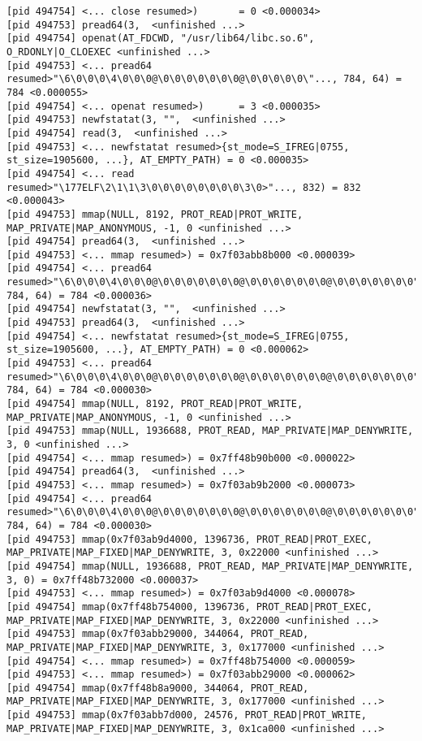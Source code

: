 \documentclass[a4paper, 12pt]{article}
\begin{document}
\begin{lstlisting}
[pid 494754] <... close resumed>)       = 0 <0.000034>
[pid 494753] pread64(3,  <unfinished ...>
[pid 494754] openat(AT_FDCWD, "/usr/lib64/libc.so.6", O_RDONLY|O_CLOEXEC <unfinished ...>
[pid 494753] <... pread64 resumed>"\6\0\0\0\4\0\0\0@\0\0\0\0\0\0\0@\0\0\0\0\0\"..., 784, 64) = 784 <0.000055>
[pid 494754] <... openat resumed>)      = 3 <0.000035>
[pid 494753] newfstatat(3, "",  <unfinished ...>
[pid 494754] read(3,  <unfinished ...>
[pid 494753] <... newfstatat resumed>{st_mode=S_IFREG|0755, st_size=1905600, ...}, AT_EMPTY_PATH) = 0 <0.000035>
[pid 494754] <... read resumed>"\177ELF\2\1\1\3\0\0\0\0\0\0\0\0\3\0>"..., 832) = 832 <0.000043>
[pid 494753] mmap(NULL, 8192, PROT_READ|PROT_WRITE, MAP_PRIVATE|MAP_ANONYMOUS, -1, 0 <unfinished ...>
[pid 494754] pread64(3,  <unfinished ...>
[pid 494753] <... mmap resumed>) = 0x7f03abb8b000 <0.000039>
[pid 494754] <... pread64 resumed>"\6\0\0\0\4\0\0\0@\0\0\0\0\0\0\0@\0\0\0\0\0\0\0@\0\0\0\0\0\0\0"..., 784, 64) = 784 <0.000036>
[pid 494754] newfstatat(3, "",  <unfinished ...>
[pid 494753] pread64(3,  <unfinished ...>
[pid 494754] <... newfstatat resumed>{st_mode=S_IFREG|0755, st_size=1905600, ...}, AT_EMPTY_PATH) = 0 <0.000062>
[pid 494753] <... pread64 resumed>"\6\0\0\0\4\0\0\0@\0\0\0\0\0\0\0@\0\0\0\0\0\0\0@\0\0\0\0\0\0\0"..., 784, 64) = 784 <0.000030>
[pid 494754] mmap(NULL, 8192, PROT_READ|PROT_WRITE, MAP_PRIVATE|MAP_ANONYMOUS, -1, 0 <unfinished ...>
[pid 494753] mmap(NULL, 1936688, PROT_READ, MAP_PRIVATE|MAP_DENYWRITE, 3, 0 <unfinished ...>
[pid 494754] <... mmap resumed>) = 0x7ff48b90b000 <0.000022>
[pid 494754] pread64(3,  <unfinished ...>
[pid 494753] <... mmap resumed>) = 0x7f03ab9b2000 <0.000073>
[pid 494754] <... pread64 resumed>"\6\0\0\0\4\0\0\0@\0\0\0\0\0\0\0@\0\0\0\0\0\0\0@\0\0\0\0\0\0\0"..., 784, 64) = 784 <0.000030>
[pid 494753] mmap(0x7f03ab9d4000, 1396736, PROT_READ|PROT_EXEC, MAP_PRIVATE|MAP_FIXED|MAP_DENYWRITE, 3, 0x22000 <unfinished ...>
[pid 494754] mmap(NULL, 1936688, PROT_READ, MAP_PRIVATE|MAP_DENYWRITE, 3, 0) = 0x7ff48b732000 <0.000037>
[pid 494753] <... mmap resumed>) = 0x7f03ab9d4000 <0.000078>
[pid 494754] mmap(0x7ff48b754000, 1396736, PROT_READ|PROT_EXEC, MAP_PRIVATE|MAP_FIXED|MAP_DENYWRITE, 3, 0x22000 <unfinished ...>
[pid 494753] mmap(0x7f03abb29000, 344064, PROT_READ, MAP_PRIVATE|MAP_FIXED|MAP_DENYWRITE, 3, 0x177000 <unfinished ...>
[pid 494754] <... mmap resumed>) = 0x7ff48b754000 <0.000059>
[pid 494753] <... mmap resumed>) = 0x7f03abb29000 <0.000062>
[pid 494754] mmap(0x7ff48b8a9000, 344064, PROT_READ, MAP_PRIVATE|MAP_FIXED|MAP_DENYWRITE, 3, 0x177000 <unfinished ...>
[pid 494753] mmap(0x7f03abb7d000, 24576, PROT_READ|PROT_WRITE, MAP_PRIVATE|MAP_FIXED|MAP_DENYWRITE, 3, 0x1ca000 <unfinished ...>

\end{lstlisting}
\end{document}
